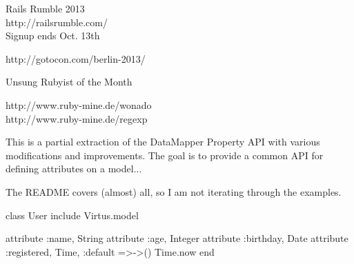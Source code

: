 \setuppapersize[S6][S6]

\usemodule[vim]
\switchtobodyfont[modern,20pt]


\setuppagenumbering[state=stop]


\setupalign[lohi]


\stopstandardmakeup
\page

\startstandardmakeup[align=middle]
  Rails Rumble 2013\\
  http://railsrumble.com/\\
  Signup ends Oct. 13th
\stopstandardmakeup
\page

\startstandardmakeup[align=middle]
  http://gotocon.com/berlin-2013/
\stopstandardmakeup
\page

\stopstandardmakeup
\page

\startstandardmakeup[align=middle]
Unsung Rubyist of the Month
\stopstandardmakeup
\page

\startstandardmakeup[align=middle]
http://www.ruby-mine.de/wonado\\
http://www.ruby-mine.de/regexp
\stopstandardmakeup
\page

\stopstandardmakeup
\page

\stopstandardmakeup

\page
This is a partial extraction of the DataMapper Property
API with various modifications and improvements. The goal is to provide a common API
for defining attributes on a model...
\page

The README covers (almost) all, so I am not iterating through the examples.
\page

\startstandardmakeup[align=middle]
\startRUBY
class User
  include Virtus.model

  attribute :name, String
  attribute :age, Integer
  attribute :birthday, Date
  attribute :registered, Time,
    :default =>->() { Time.now }
end
\stopRUBY
\stopstandardmakeup

\page


